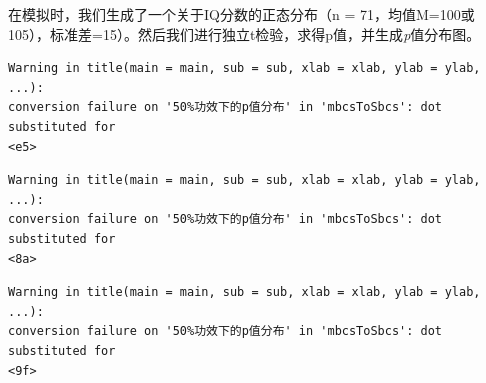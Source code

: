 \documentclass[
  letterpaper,
  DIV=11,
  numbers=noendperiod]{scrreprt}
\newenvironment{Shaded}{\begin{snugshade}}{\end{snugshade}}
\newcommand{\AttributeTok}[1]{\textcolor[rgb]{0.40,0.45,0.13}{#1}}
\newcommand{\CommentTok}[1]{\textcolor[rgb]{0.37,0.37,0.37}{#1}}
\newcommand{\ControlFlowTok}[1]{\textcolor[rgb]{0.00,0.23,0.31}{#1}}
\newcommand{\DecValTok}[1]{\textcolor[rgb]{0.68,0.00,0.00}{#1}}
\newcommand{\FloatTok}[1]{\textcolor[rgb]{0.68,0.00,0.00}{#1}}
\newcommand{\FunctionTok}[1]{\textcolor[rgb]{0.28,0.35,0.67}{#1}}
\newcommand{\NormalTok}[1]{\textcolor[rgb]{0.00,0.23,0.31}{#1}}
\newcommand{\OtherTok}[1]{\textcolor[rgb]{0.00,0.23,0.31}{#1}}
\newcommand{\SpecialCharTok}[1]{\textcolor[rgb]{0.37,0.37,0.37}{#1}}
\begin{document}
\begin{Shaded}
\end{Shaded}

在模拟时，我们生成了一个关于IQ分数的正态分布（n =
71，均值M=100或105），标准差=15）。然后我们进行独立t检验，求得p值，并生成\emph{p}值分布图。

\begin{verbatim}
Warning in title(main = main, sub = sub, xlab = xlab, ylab = ylab, ...):
conversion failure on '50%功效下的p值分布' in 'mbcsToSbcs': dot substituted for
<e5>
\end{verbatim}

\begin{verbatim}
Warning in title(main = main, sub = sub, xlab = xlab, ylab = ylab, ...):
conversion failure on '50%功效下的p值分布' in 'mbcsToSbcs': dot substituted for
<8a>
\end{verbatim}

\begin{verbatim}
Warning in title(main = main, sub = sub, xlab = xlab, ylab = ylab, ...):
conversion failure on '50%功效下的p值分布' in 'mbcsToSbcs': dot substituted for
<9f>
\end{verbatim}
\end{document}
